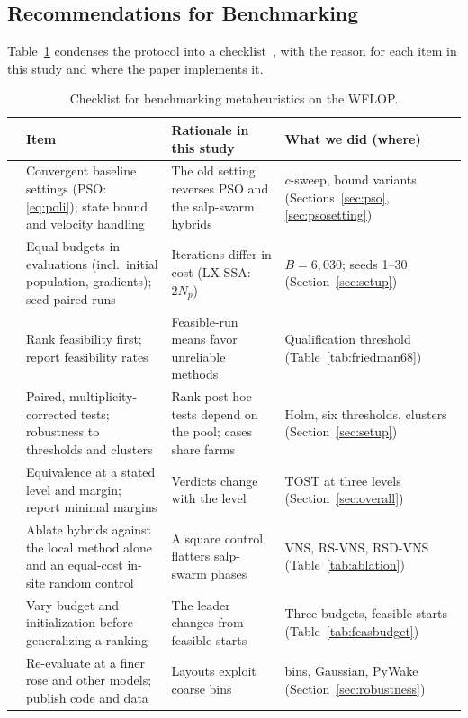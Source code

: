 \subsection{Recommendations for Benchmarking}
\label{sec:disc-recs}
Table~\ref{tab:recommendations} condenses the protocol into a checklist~\cite{BartzBeielstein2020,LaTorre2021}, with the reason for each item in this study and where the paper implements it.
\begin{table}[!t]
\centering
\caption{Checklist for benchmarking metaheuristics on the WFLOP.}
\label{tab:recommendations}
\footnotesize
\begin{tabular}{@{}>{\raggedright\arraybackslash}p{}>{\raggedright\arraybackslash}p{}>{\raggedright\arraybackslash}p{}>{\raggedright\arraybackslash}p{}@{}}
\toprule
& Item & Rationale in this study & What we did (where) \\
\midrule
1 & Convergent baseline settings (PSO: \eqref{eq:poli}); state bound and velocity handling & The old setting reverses PSO and the salp-swarm hybrids & $c$-sweep, bound variants (Sections~\ref{sec:pso}, \ref{sec:psosetting}) \\
2 & Equal budgets in evaluations (incl.\ initial population, gradients); seed-paired runs & Iterations differ in cost (LX-SSA: $2N_p$) & $B=6{,}030$; seeds 1--30 (Section~\ref{sec:setup}) \\
3 & Rank feasibility first; report feasibility rates & Feasible-run means favor unreliable methods & Qualification threshold (Table~\ref{tab:friedman68}) \\
4 & Paired, multiplicity-corrected tests; robustness to thresholds and clusters & Rank post hoc tests depend on the pool; cases share farms & Holm, six thresholds, \NXClusters{} clusters (Section~\ref{sec:setup}) \\
5 & Equivalence at a stated level and margin; report minimal margins & Verdicts change with the level & TOST at three levels (Section~\ref{sec:overall}) \\
6 & Ablate hybrids against the local method alone and an equal-cost in-site random control & A square control flatters salp-swarm phases & VNS, RS-VNS, RSD-VNS (Table~\ref{tab:ablation}) \\
7 & Vary budget and initialization before generalizing a ranking & The leader changes from feasible starts & Three budgets, feasible starts (Table~\ref{tab:feasbudget}) \\
8 & Re-evaluate at a finer rose and other models; publish code and data & Layouts exploit coarse bins & 1\textdegree{} bins, Gaussian, PyWake (Section~\ref{sec:robustness}) \\
\bottomrule
\end{tabular}
\end{table}

